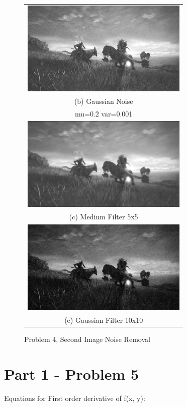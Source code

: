 \documentclass[conference]{IEEEtran}
\begin{document}
\begin{figure}
    \begin{tabular}{c}
        \includegraphics[width=8cm]{images/eldenring_noise_2.jpg} \\
        (b) Gaussian Noise \\[6pt]
        mu=0.2 var=0.001 \\[6pt]
        \includegraphics[width=8cm]{images/eldenring_average_2.jpg} \\
        (c) Medium Filter 5x5 \\[6pt]
        \includegraphics[width=8cm]{images/eldenring_g_2.jpg} \\
        (e) Gaussian Filter 10x10 \\[6pt]
    \end{tabular}
    \caption{Problem 4, Second Image Noise Removal}
\end{figure}

\section*{Part 1 - Problem 5}

Equations for First order derivative of f(x, y):
\end{document}
